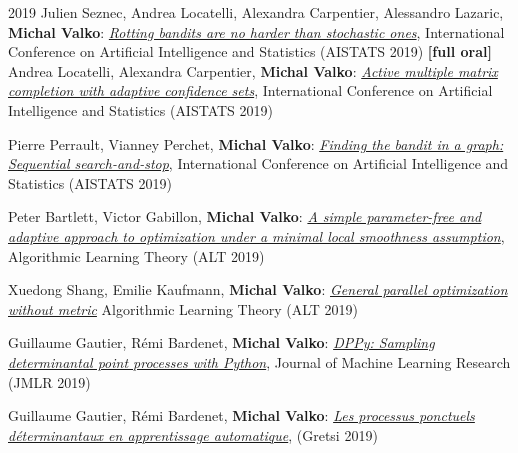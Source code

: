 \documentclass{resume}
\begin{document}
\begin{category}{2019}
\citembullet
Julien Seznec, Andrea Locatelli, Alexandra Carpentier, Alessandro Lazaric, {\bf Michal Valko}:
\href{http://researchers.lille.inria.fr/~valko/hp/serve.php?what=publications/seznec2019rotting.pdf}{\emph{Rotting bandits are no harder than stochastic ones}},
International Conference on Artificial Intelligence and Statistics
({\sf AISTATS 2019})   {\bf [full oral]}
\citembullet
Andrea Locatelli, Alexandra Carpentier, {\bf Michal Valko}:
\href{http://researchers.lille.inria.fr/~valko/hp/serve.php?what=publications/locatelli2019active.pdf}
{\emph{Active multiple matrix completion with adaptive confidence sets}},
International Conference on Artificial Intelligence and Statistics
({\sf AISTATS 2019}) 


\citembullet
Pierre Perrault, Vianney Perchet,   {\bf Michal Valko}:
\href{http://researchers.lille.inria.fr/~valko/hp/serve.php?what=publications/perrault2019finding.pdf}
{\emph{Finding the bandit in a graph: Sequential search-and-stop}},
International Conference on Artificial Intelligence and Statistics
({\sf AISTATS 2019}) 


\citembullet
Peter Bartlett, Victor Gabillon,   {\bf Michal Valko}:
\href{http://researchers.lille.inria.fr/~valko/hp/serve.php?what=publications/bartlett2019simple.pdf}
{\emph{A simple parameter-free and adaptive approach to optimization under a minimal local smoothness assumption}},
Algorithmic Learning Theory
({\sf ALT 2019}) 

\citembullet
Xuedong Shang, Emilie Kaufmann, {\bf Michal Valko}:
\href{http://researchers.lille.inria.fr/~valko/hp/serve.php?what=publications/shang2019general.pdf}
{\emph{General parallel optimization without metric}}
Algorithmic Learning Theory
({\sf ALT 2019}) 



\citemnobullet
Guillaume Gautier, R\' emi Bardenet, {\bf Michal Valko}:
\href{https://arxiv.org/abs/1809.07258}
{\emph{DPPy: Sampling determinantal point processes with Python}},
Journal of Machine Learning Research
({\sf JMLR 2019}) 

\citembullet
Guillaume Gautier, R\' emi Bardenet, {\bf Michal Valko}:
\href{http://researchers.lille.inria.fr/~valko/hp/publications/gautier2019processus.pdf}
{\emph{Les processus ponctuels d\'eterminantaux en apprentissage automatique}},
({\sf Gretsi 2019}) 


\end{category}
\end{document}
